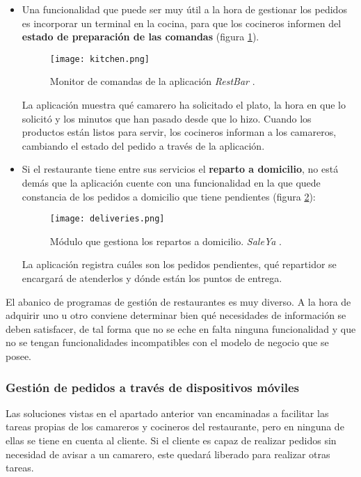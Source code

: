 \begin{itemize}
    \item Una funcionalidad que puede ser muy útil a la hora de gestionar
    los pedidos es incorporar un terminal en la cocina, para que los cocineros
    informen del \textbf{estado de preparación de las comandas} (figura
    \ref{fig:kitchen}).

    \begin{figure}[!h]
      \begin{center}
        \texttt{[image: kitchen.png]}
        \caption{Monitor de comandas de la aplicación \emph{RestBar}
        \cite{bib:restBar}.}
        \label{fig:kitchen}
      \end{center}
    \end{figure}
    
    La aplicación muestra qué camarero ha solicitado el plato, la hora en que
    lo solicitó y los minutos que han pasado desde que lo hizo. Cuando los
    productos están listos para servir, los cocineros informan a los
    camareros, cambiando el estado del pedido a través de la aplicación.

    \item Si el restaurante tiene entre sus servicios el \textbf{reparto a
    domicilio}, no está demás que la aplicación cuente con una funcionalidad
    en la que quede constancia de los pedidos a domicilio que tiene pendientes
    (figura \ref{fig:deliveries}):

    \begin{figure}[!h]
      \begin{center}
        \texttt{[image: deliveries.png]}
        \caption{Módulo que gestiona los repartos a domicilio. \emph{SaleYa}
        \cite{bib:saleYa}.}
        \label{fig:deliveries}
      \end{center}
    \end{figure}

    La aplicación registra cuáles son los pedidos pendientes, qué repartidor
    se encargará de atenderlos y dónde están los puntos de entrega.
    \end{itemize}

    El abanico de programas de gestión de restaurantes es muy diverso. A la
    hora de adquirir uno u otro conviene determinar bien qué necesidades de
    información se deben satisfacer, de tal forma que no se eche en falta 
    ninguna funcionalidad y que no se tengan funcionalidades incompatibles
    con el modelo de negocio que se posee.

    \subsubsection{Gestión de pedidos a través de dispositivos móviles}
    Las soluciones vistas en el apartado anterior van encaminadas a
    facilitar las tareas propias de los camareros y cocineros del restaurante,
    pero en ninguna de ellas se tiene en cuenta al cliente. Si el cliente es
    capaz de realizar pedidos sin necesidad de avisar a un camarero, este
    quedará liberado para realizar otras tareas.

